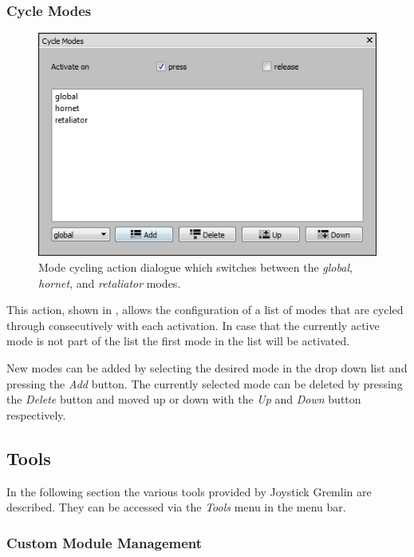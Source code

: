 \documentclass[a4, 10pt]{article}
\newcommand{\JG}{Joystick Gremlin}
\begin{document}
\subsubsection{Cycle Modes}

\begin{figure}[bt]
    \centering

    \includegraphics[width=0.75\linewidth]{images/action_cycle_modes}
    \caption{Mode cycling action dialogue which switches between the
        \emph{global}, \emph{hornet}, and \emph{retaliator} modes.}
    \label{fig:action_cycle_modes}
\end{figure}

This action, shown in , allows the
configuration of a list of modes that are cycled through consecutively
with each activation. In case that the currently active mode is not part
of the list the first mode in the list will be activated.

New modes can be added by selecting the desired mode in the drop down
list and pressing the \emph{Add} button. The currently selected mode can
be deleted by pressing the \emph{Delete} button and moved up or down
with the \emph{Up} and \emph{Down} button respectively.

\FloatBarrier


\subsection{Tools}

In the following section the various tools provided by \JG{} are
described. They can be accessed via the \emph{Tools} menu in the menu
bar.

\subsubsection{Custom Module Management}
\end{document}
